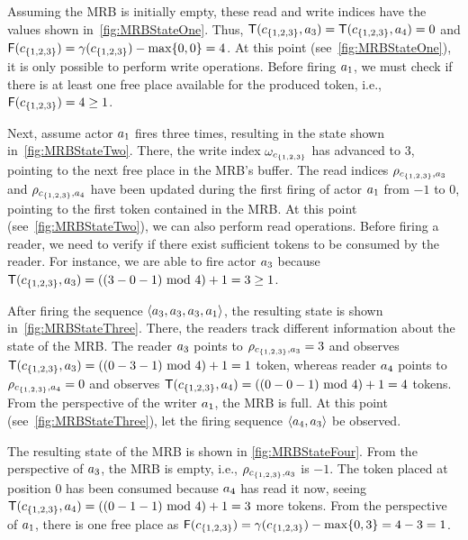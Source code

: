 \par
Assuming the \ac{MRB} is initially empty, these read and write indices have the values shown in~\cref{fig:MRBStateOne}.
Thus, $\mathsf{T}(c_{\{1,2,3\}}, a_3) = \mathsf{T}(c_{\{1,2,3\}}, a_4) = 0$ and $\mathsf{F}(c_{\{1,2,3\}}) = \gamma(c_{\{1,2,3\}}) - \max \{ 0, 0 \} = 4$.
At this point (see~\cref{fig:MRBStateOne}), it is only possible to perform write operations.
Before firing $a_1$, we must check if there is at least one free place available for the produced token, i.e., $\mathsf{F}(c_{\{1,2,3\}}) = 4 \geq 1$.
\par
Next, assume actor $a_1$ fires three times, resulting in the state shown in~\cref{fig:MRBStateTwo}.
There, the write index $\omega_{c_{\{1,2,3\}}}$ has advanced to $3$, pointing to the next free place in the \ac{MRB}'s buffer.
The read indices $\rho_{c_{\{1,2,3\}},a_3}$ and $\rho_{c_{\{1,2,3\}},a_4}$ have been updated during the first firing of actor $a_1$ from $-1$ to $0$, pointing to the first token contained in the \ac{MRB}.
At this point (see~\cref{fig:MRBStateTwo}), we can also perform read operations.
Before firing a reader, we need to verify if there exist sufficient tokens to be consumed by the reader.
For instance, we are able to fire actor $a_3$ because $\Tokens(\channel_{\{1,2,3\}}, \actor_3) = ((3-0-1)\ \mathrm{mod}\ 4) + 1 = 3 \geq 1$.
\par
After firing the sequence $\langle a_3, a_3, a_3, a_1 \rangle$, the resulting state is shown in~\cref{fig:MRBStateThree}.
There, the readers track different information about the state of the \ac{MRB}.
The reader $a_3$ points to $\rho_{c_{\{1,2,3\}},a_3}=3$ and observes $\mathsf{T}(c_{\{1,2,3\}}, a_3)=((0-3-1)\ \mathrm{mod}\ 4)+1 = 1$ token, whereas reader $a_4$ points to $\rho_{c_{\{1,2,3\}},a_4}=0$ and observes $\mathsf{T}(c_{\{1,2,3\}}, a_4)=((0-0-1)\ \mathrm{mod}\ 4)+1 = 4$ tokens.
From the perspective of the writer $a_1$, the \ac{MRB} is full.
At this point (see~\cref{fig:MRBStateThree}), let the firing sequence $\langle a_4, a_3 \rangle$ be observed.
\par
The resulting state of the \ac{MRB} is shown in \cref{fig:MRBStateFour}.
From the perspective of $a_3$, the \ac{MRB} is empty, i.e., $\rho_{c_{\{1,2,3\}},a_3}$ is $-1$.
The token placed at position $0$ has been consumed because $a_4$ has read it now, seeing $\Tokens(\channel_{\{1,2,3\}}, \actor_4)=((0-1-1)\ \mathrm{mod}\ 4)+1 = 3$ more tokens.
From the perspective of $a_1$, there is one free place as $\mathsf{F}(c_{\{1,2,3\}}) = \gamma(c_{\{1,2,3\}}) - \max \{ 0, 3 \} = 4 - 3 = 1$.

